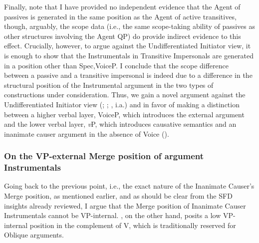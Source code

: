 \documentclass[output=paper,colorlinks,citecolor=brown]{langscibook}
\begin{document}
Finally, note that I have provided no independent evidence that the Agent of passives is generated in the same position as the Agent of active transitives, though, arguably, the scope data (i.e., the same scope-taking ability of passives as other structures involving the Agent QP) do provide indirect evidence to this effect. Crucially, however, to argue against the Undifferentiated Initiator view, it is enough to show that the Instrumentals in Transitive Impersonals are generated in a position other than Spec,VoiceP.  I conclude that the scope difference between a passive  and a transitive impersonal  is indeed due to a difference in the structural position of the Instrumental argument in the two types of constructions under consideration. Thus, we gain a novel argument against the Undifferentiated Initiator view (\citealt{ant:Ramchand2008}; \citealt{Legate2014}; \citealt{Wood2017}, i.a.) and in favor of making a distinction between a higher verbal layer, VoiceP, which introduces the external argument and the lower verbal layer, \textit{v}P, which introduces causative semantics and an inanimate causer argument in the absence of Voice (\citealt{Lavine2022,Lavine2023}).  


\subsubsection{On the VP-external Merge position of argument Instrumentals}
\label{sec:antonyuk:3.2.2}

Going back to the previous point, i.e., the exact nature of the Inanimate Causer’s Merge position, as mentioned earlier, and as should be clear from the SFD insights already reviewed, I argue that the Merge position of Inanimate Causer Instrumentals cannot be VP-internal. \citet{Lavine2022, Lavine2023}, on the other hand, posits a low VP-internal position in the complement of V, which is traditionally reserved for Oblique arguments. 
\end{document}

